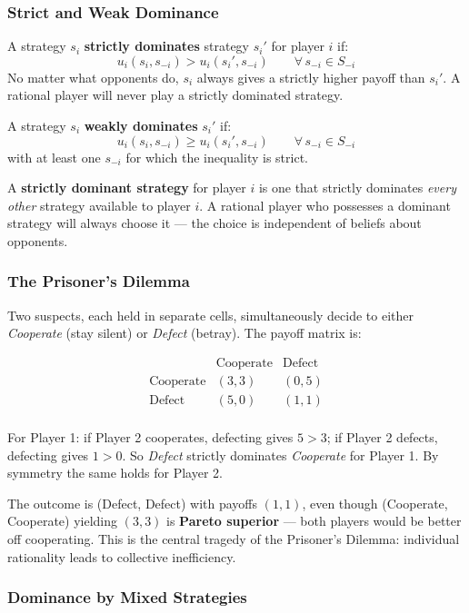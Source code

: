 \documentclass[hidelinks]{article}
\begin{document}
\subsubsection{Strict and Weak Dominance}

A strategy $s_i$ \textbf{strictly dominates} strategy $s_i'$ for player $i$ if:
\[
u_i(s_i, s_{-i}) > u_i(s_i', s_{-i}) \qquad \forall\, s_{-i} \in S_{-i}
\]
No matter what opponents do, $s_i$ always gives a strictly higher payoff than $s_i'$. A rational player will never play a strictly dominated strategy.

A strategy $s_i$ \textbf{weakly dominates} $s_i'$ if:
\[
u_i(s_i, s_{-i}) \geq u_i(s_i', s_{-i}) \qquad \forall\, s_{-i} \in S_{-i}
\]
with at least one $s_{-i}$ for which the inequality is strict.

A \textbf{strictly dominant strategy} for player $i$ is one that strictly dominates \textit{every other} strategy available to player $i$. A rational player who possesses a dominant strategy will always choose it — the choice is independent of beliefs about opponents.

\subsubsection{The Prisoner's Dilemma}

Two suspects, each held in separate cells, simultaneously decide to either \textit{Cooperate} (stay silent) or \textit{Defect} (betray). The payoff matrix is:

\[
\begin{array}{c|cc}
 & \text{Cooperate} & \text{Defect} \\
\hline
\text{Cooperate} & (3,3) & (0,5) \\
\text{Defect}    & (5,0) & (1,1) \\
\end{array}
\]

For Player 1: if Player 2 cooperates, defecting gives $5 > 3$; if Player 2 defects, defecting gives $1 > 0$. So \textit{Defect} strictly dominates \textit{Cooperate} for Player 1. By symmetry the same holds for Player 2.

The outcome is (Defect, Defect) with payoffs $(1,1)$, even though (Cooperate, Cooperate) yielding $(3,3)$ is \textbf{Pareto superior} — both players would be better off cooperating. This is the central tragedy of the Prisoner's Dilemma: individual rationality leads to collective inefficiency.

\subsubsection{Dominance by Mixed Strategies}
\end{document}
